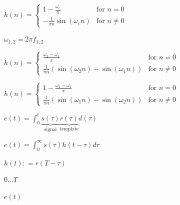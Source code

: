 \documentclass[12pt,a4paper]{article}
\def\lthtmlcheckvsize{\ifdim\ht\sizebox<\vsize 
  \ifdim\wd\sizebox<\hsize\expandafter\hfill\fi \expandafter\vfill
  \else\expandafter\vss\fi}%
\begin{document}
{\newpage\clearpage
{}%
$\displaystyle h(n)=
\left\{ 
\begin{array}{ll}
1-\frac{\omega_c}{\pi} & \mbox{for $n=0$} \\
-\frac{1}{\pi n} \sin(\omega_c n) & \mbox{for $n\neq 0$}
\end{array}
\right.
$%
\lthtmlindisplaymathZ
\lthtmlcheckvsize\clearpage}

{\newpage\clearpage
{}%
$\omega_{1,2}=2\pi f_{1,2}$%
\lthtmlindisplaymathZ
\lthtmlcheckvsize\clearpage}

{\newpage\clearpage
{}%
$\displaystyle h(n)=
\left\{ 
\begin{array}{ll}
\frac{\omega_2-\omega_1}{\pi} & \mbox{for $n=0$} \\
\frac{1}{\pi n}(\sin(\omega_2 n)-\sin(\omega_1 n)) & \mbox{for $n\neq 0$}
\end{array}
\right.
$%
\lthtmlindisplaymathZ
\lthtmlcheckvsize\clearpage}

{\newpage\clearpage
{}%
$\displaystyle h(n)=
\left\{ 
\begin{array}{ll}
1-\frac{\omega_2-\omega_1}{\pi} & \mbox{for $n=0$} \\
\frac{1}{\pi n}(\sin(\omega_1 n)-\sin(\omega_2 n)) & \mbox{for $n\neq 0$}
\end{array}
\right.
$%
\lthtmlindisplaymathZ
\lthtmlcheckvsize\clearpage}

{\newpage\clearpage
{}%
$\displaystyle e(t) = \int_{0}^{t} \underbrace{s(\tau)}_{\mbox{signal}} \underbrace{r(\tau)}_{\mbox{template}} d(\tau)
$%
\lthtmlindisplaymathZ
\lthtmlcheckvsize\clearpage}

{\newpage\clearpage
{}%
$\displaystyle e(t) = \int_{0}^{\infty} s(\tau) h(t - \tau) d\tau 
$%
\lthtmlindisplaymathZ
\lthtmlcheckvsize\clearpage}

{\newpage\clearpage
{}%
$h(t) : = r(T - \tau)$%
\lthtmlindisplaymathZ
\lthtmlcheckvsize\clearpage}

{\newpage\clearpage
{}%
$0\ldots T$%
\lthtmlindisplaymathZ
\lthtmlcheckvsize\clearpage}

{\newpage\clearpage
{}%
$\displaystyle e(t)$%
\lthtmlindisplaymathZ
\lthtmlcheckvsize\clearpage}
\end{document}
